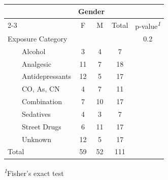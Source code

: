 \documentclass[
]{article}
\begin{document}
\begin{table}[t]
\fontsize{12.0pt}{14.4pt}\selectfont
\begin{tabular*}{\linewidth}{@{\extracolsep{\fill}}lcccc}
\toprule
 & \multicolumn{2}{c}{Gender} &  &  \\ 
\cmidrule(lr){2-3}
 & F & M & Total & p-value\textsuperscript{\textit{1}} \\ 
\midrule\addlinespace[2.5pt]
Exposure Category &  &  &  & 0.2 \\ 
    Alcohol & 3 & 4 & 7 &  \\ 
    Analgesic & 11 & 7 & 18 &  \\ 
    Antidepressants & 12 & 5 & 17 &  \\ 
    CO, As, CN & 4 & 7 & 11 &  \\ 
    Combination & 7 & 10 & 17 &  \\ 
    Sedatives & 4 & 3 & 7 &  \\ 
    Street Drugs & 6 & 11 & 17 &  \\ 
    Unknown & 12 & 5 & 17 &  \\ 
Total & 59 & 52 & 111 &  \\ 
\bottomrule
\end{tabular*}
\begin{minipage}{\linewidth}
\textsuperscript{\textit{1}}Fisher's exact test\\
\end{minipage}
\end{table}
\end{document}
